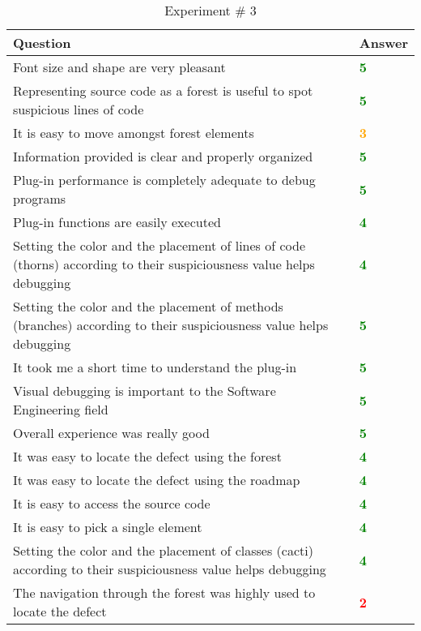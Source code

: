 \begin{table}
\caption{Experiment \# 3}
\begin{tabular}{m{11cm} | l}
    \textbf{Question} & \textbf{Answer}\\
    \hline
    Font size and shape are very pleasant & \textbf{\textcolor{green}{5}} \\ \hline
    Representing source code as a forest is useful to spot suspicious lines of code & \textbf{\textcolor{green}{5}} \\ \hline
    It is easy to move amongst forest elements & \textbf{\textcolor{orange}{3}} \\ \hline
    Information provided is clear and properly organized & \textbf{\textcolor{green}{5}} \\ \hline
    Plug-in performance is completely adequate to debug programs & \textbf{\textcolor{green}{5}} \\ \hline
    Plug-in functions are easily executed & \textbf{\textcolor{green}{4}} \\ \hline
    Setting the color and the placement of lines of code (thorns) according to their suspiciousness value helps debugging & \textbf{\textcolor{green}{4}} \\ \hline
    Setting the color and the placement of methods (branches) according to their suspiciousness value helps debugging & \textbf{\textcolor{green}{5}} \\ \hline
    It took me a short time to understand the plug-in & \textbf{\textcolor{green}{5}} \\ \hline
    Visual debugging is important to the Software Engineering field & \textbf{\textcolor{green}{5}} \\ \hline
    Overall experience was really good & \textbf{\textcolor{green}{5}} \\ \hline
    It was easy to locate the defect using the forest & \textbf{\textcolor{green}{4}} \\ \hline
    It was easy to locate the defect using the roadmap &
    \textbf{\textcolor{green}{4}} \\ \hline It is easy to access the source code & \textbf{\textcolor{green}{4}} \\ \hline
    It is easy to pick a single element & \textbf{\textcolor{green}{4}} \\ \hline
    Setting the color and the placement of classes (cacti) according to their
    suspiciousness value helps debugging & \textbf{\textcolor{green}{4}} \\ \hline The navigation through the forest was highly used to locate the defect & \textbf{\textcolor{red}{2}} \\ \hline

\end{tabular}
\end{table}
